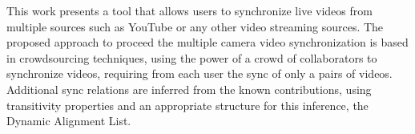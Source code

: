 This work presents a tool that allows users to synchronize live videos from multiple sources such as YouTube or any other video streaming sources. The proposed approach to proceed the multiple camera video synchronization is based in crowdsourcing techniques, using the power of a crowd of collaborators to synchronize videos, requiring from each user the sync of only a pairs of videos. Additional sync relations are inferred from the known contributions, using transitivity properties and an appropriate structure for this inference, the Dynamic Alignment List.
